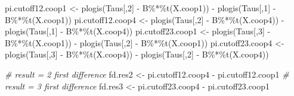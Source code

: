 \documentclass[
]{article}
\newenvironment{Shaded}{\begin{snugshade}}{\end{snugshade}}
\newcommand{\CommentTok}[1]{\textcolor[rgb]{0.56,0.35,0.01}{\textit{#1}}}
\newcommand{\DecValTok}[1]{\textcolor[rgb]{0.00,0.00,0.81}{#1}}
\newcommand{\FunctionTok}[1]{\textcolor[rgb]{0.00,0.00,0.00}{#1}}
\newcommand{\NormalTok}[1]{#1}
\newcommand{\OtherTok}[1]{\textcolor[rgb]{0.56,0.35,0.01}{#1}}
\newcommand{\SpecialCharTok}[1]{\textcolor[rgb]{0.00,0.00,0.00}{#1}}
\begin{document}
\begin{Shaded}
\begin{Highlighting}[]
\NormalTok{pi.cutoff12.coop1 }\OtherTok{\textless{}{-}} \FunctionTok{plogis}\NormalTok{(Taus[,}\DecValTok{2}\NormalTok{] }\SpecialCharTok{{-}}\NormalTok{ B}\SpecialCharTok{\%*\%}\FunctionTok{t}\NormalTok{(X.coop1)) }\SpecialCharTok{{-}} \FunctionTok{plogis}\NormalTok{(Taus[,}\DecValTok{1}\NormalTok{] }\SpecialCharTok{{-}}\NormalTok{ B}\SpecialCharTok{\%*\%}\FunctionTok{t}\NormalTok{(X.coop1))}
\NormalTok{pi.cutoff12.coop4 }\OtherTok{\textless{}{-}} \FunctionTok{plogis}\NormalTok{(Taus[,}\DecValTok{2}\NormalTok{] }\SpecialCharTok{{-}}\NormalTok{ B}\SpecialCharTok{\%*\%}\FunctionTok{t}\NormalTok{(X.coop4)) }\SpecialCharTok{{-}} \FunctionTok{plogis}\NormalTok{(Taus[,}\DecValTok{1}\NormalTok{] }\SpecialCharTok{{-}}\NormalTok{ B}\SpecialCharTok{\%*\%}\FunctionTok{t}\NormalTok{(X.coop4))}
\NormalTok{pi.cutoff23.coop1 }\OtherTok{\textless{}{-}} \FunctionTok{plogis}\NormalTok{(Taus[,}\DecValTok{3}\NormalTok{] }\SpecialCharTok{{-}}\NormalTok{ B}\SpecialCharTok{\%*\%}\FunctionTok{t}\NormalTok{(X.coop1)) }\SpecialCharTok{{-}} \FunctionTok{plogis}\NormalTok{(Taus[,}\DecValTok{2}\NormalTok{] }\SpecialCharTok{{-}}\NormalTok{ B}\SpecialCharTok{\%*\%}\FunctionTok{t}\NormalTok{(X.coop1))}
\NormalTok{pi.cutoff23.coop4 }\OtherTok{\textless{}{-}} \FunctionTok{plogis}\NormalTok{(Taus[,}\DecValTok{3}\NormalTok{] }\SpecialCharTok{{-}}\NormalTok{ B}\SpecialCharTok{\%*\%}\FunctionTok{t}\NormalTok{(X.coop4)) }\SpecialCharTok{{-}} \FunctionTok{plogis}\NormalTok{(Taus[,}\DecValTok{2}\NormalTok{] }\SpecialCharTok{{-}}\NormalTok{ B}\SpecialCharTok{\%*\%}\FunctionTok{t}\NormalTok{(X.coop4))}

\CommentTok{\# result = 2 first difference}
\NormalTok{fd.res2 }\OtherTok{\textless{}{-}}\NormalTok{ pi.cutoff12.coop4 }\SpecialCharTok{{-}}\NormalTok{ pi.cutoff12.coop1}
\CommentTok{\# result = 3 first difference}
\NormalTok{fd.res3 }\OtherTok{\textless{}{-}}\NormalTok{ pi.cutoff23.coop4 }\SpecialCharTok{{-}}\NormalTok{ pi.cutoff23.coop1}


\end{Highlighting}
\end{Shaded}
\end{document}
